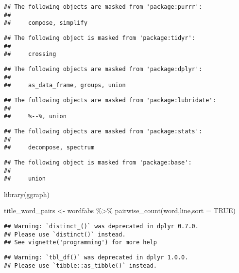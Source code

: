 \documentclass[]{tufte-book}
\newenvironment{Shaded}{}{}
\newcommand{\AttributeTok}[1]{\textcolor[rgb]{0.49,0.56,0.16}{#1}}
\newcommand{\ConstantTok}[1]{\textcolor[rgb]{0.53,0.00,0.00}{#1}}
\newcommand{\FunctionTok}[1]{\textcolor[rgb]{0.02,0.16,0.49}{#1}}
\newcommand{\NormalTok}[1]{#1}
\newcommand{\OtherTok}[1]{\textcolor[rgb]{0.00,0.44,0.13}{#1}}
\newcommand{\SpecialCharTok}[1]{\textcolor[rgb]{0.25,0.44,0.63}{#1}}
\begin{document}
\begin{verbatim}
## The following objects are masked from 'package:purrr':
## 
##     compose, simplify
\end{verbatim}

\begin{verbatim}
## The following object is masked from 'package:tidyr':
## 
##     crossing
\end{verbatim}

\begin{verbatim}
## The following objects are masked from 'package:dplyr':
## 
##     as_data_frame, groups, union
\end{verbatim}

\begin{verbatim}
## The following objects are masked from 'package:lubridate':
## 
##     %--%, union
\end{verbatim}

\begin{verbatim}
## The following objects are masked from 'package:stats':
## 
##     decompose, spectrum
\end{verbatim}

\begin{verbatim}
## The following object is masked from 'package:base':
## 
##     union
\end{verbatim}

\begin{Shaded}
\begin{Highlighting}[]
\FunctionTok{library}\NormalTok{(ggraph)}

\NormalTok{title\_word\_pairs }\OtherTok{\textless{}{-}}\NormalTok{ wordfabs }\SpecialCharTok{\%\textgreater{}\%}
        \FunctionTok{pairwise\_count}\NormalTok{(word,line,}\AttributeTok{sort =} \ConstantTok{TRUE}\NormalTok{)}
\end{Highlighting}
\end{Shaded}

\begin{verbatim}
## Warning: `distinct_()` was deprecated in dplyr 0.7.0.
## Please use `distinct()` instead.
## See vignette('programming') for more help
\end{verbatim}

\begin{verbatim}
## Warning: `tbl_df()` was deprecated in dplyr 1.0.0.
## Please use `tibble::as_tibble()` instead.
\end{verbatim}
\end{document}
